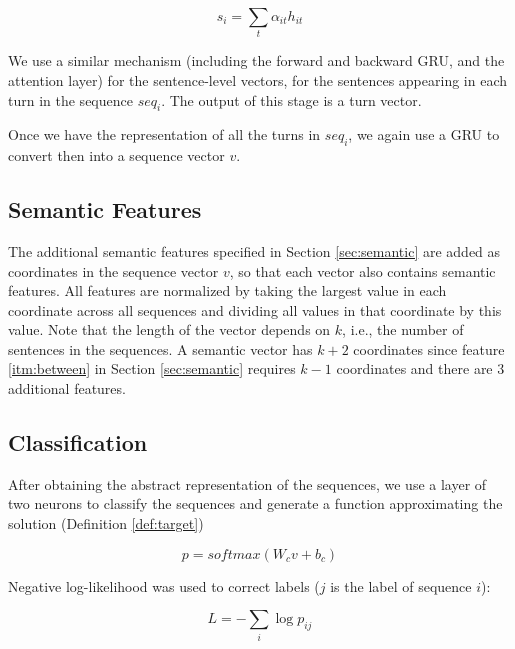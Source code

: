 \begin{equation*}
	s_i = \sum_{t} \alpha_{it} h_{it}
\end{equation*}

We use a similar mechanism (including the forward and backward 
GRU, and the attention layer) for the sentence-level vectors, 
for the sentences appearing in each turn in the sequence $seq_i$. 
The output of this stage is a turn vector. 

Once we have the representation of all the turns in $seq_i$, 
we again use a GRU to convert then into a sequence vector $v$. 

\subsection{Semantic Features}
The additional semantic features specified in Section \ref{sec:semantic} 
are added as coordinates in the sequence vector $v$, so that 
each vector also contains semantic features. 
All features are normalized by taking the largest 
value in each coordinate across all sequences and dividing 
all values in that coordinate by this value.  
Note that the length of the vector depends on $k$, 
i.e., the number of sentences in the sequences. 
A semantic vector has $k+2$ coordinates since feature \ref{itm:between} in Section \ref{sec:semantic} requires $k-1$ coordinates 
and there are $3$ additional features. 


\subsection{Classification}
After obtaining the abstract representation of the sequences, 
we use a layer of two neurons to classify the sequences and 
generate a function approximating the solution (Definition \ref{def:target}) 

\begin{equation*}
	p = softmax(W_c v + b_c)
\end{equation*}

Negative log-likelihood was used to correct labels ($j$ is the label of sequence $i$): 

\begin{equation*}
	L = - \sum_{i} \log{p_{ij}}
\end{equation*}


